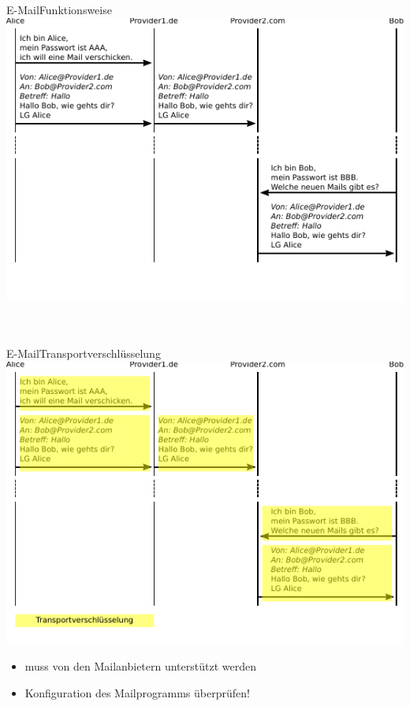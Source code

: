  \begin{frame}{E-Mail}{Funktionsweise}
    \includegraphics[width=.9\textwidth]{images/maildaten.pdf}
    \scriptsize
    ~\\
    ~\\
  \end{frame}

  \begin{frame}{E-Mail}{Transportverschlüsselung}
    \includegraphics[width=.9\textwidth]{images/maildaten_trans.pdf}
    \begin{itemize}
      \scriptsize
      \item muss von den Mailanbietern unterstützt werden
      \item Konfiguration des Mailprogramms überprüfen!
    \end{itemize}
  \end{frame}

